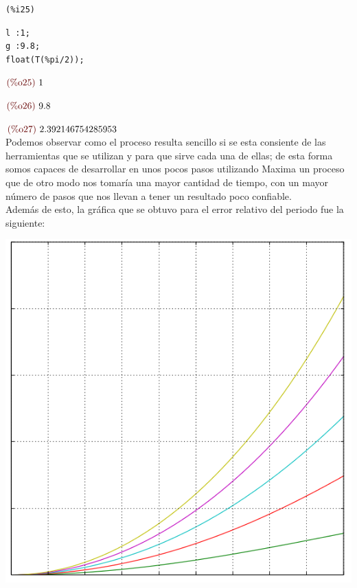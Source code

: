 \documentclass[12pt]{article}
\begin{document}
\noindent
\begin{minipage}[t]{8ex}{\color{red}\bf
\begin{verbatim}
(%i25) 
\end{verbatim}}
\end{minipage}
\begin{minipage}[t]{\textwidth}{\color{blue}
\begin{verbatim}
l :1;
g :9.8;
float(T(%pi/2));
\end{verbatim}}
\end{minipage}
\begin{math}\displaystyle
\parbox{8ex}{\color{labelcolor}(\%o25) }
1
\end{math}

\begin{math}\displaystyle
\parbox{8ex}{\color{labelcolor}(\%o26) }
9.8
\end{math}

\begin{math}\displaystyle
\parbox{8ex}{\color{labelcolor}(\%o27) }
2.392146754285953
\end{math}\\

Podemos observar como el proceso resulta sencillo si se esta consiente de las herramientas que se utilizan y para que sirve cada una de ellas; de esta forma somos capaces de desarrollar en unos pocos pasos utilizando Maxima un proceso que de otro modo nos tomaría una mayor cantidad de tiempo, con un mayor número de pasos que nos llevan a tener un resultado poco confiable.\\

Además de esto, la gráfica que se obtuvo para el error relativo del periodo fue la siguiente:
\begin{center}
\includegraphics[scale=0.5]{actividad9.png}
\end{center}
\end{document}
